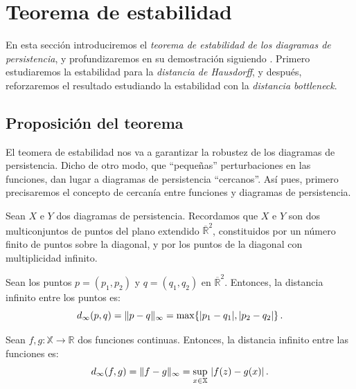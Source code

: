 
\section{Teorema de estabilidad}
En esta sección introduciremos el \emph{teorema de estabilidad de los diagramas de persistencia}, y profundizaremos en su demostración siguiendo \cite{Cohen-Steiner2007}. Primero estudiaremos la estabilidad para la \emph{distancia de Hausdorff}, y después, reforzaremos el resultado estudiando la estabilidad con la \emph{distancia bottleneck}.
\subsection{Proposición del teorema}
El teomera de estabilidad nos va a garantizar la robustez de los diagramas de persistencia. Dicho de otro modo, que ``pequeñas'' perturbaciones en las funciones, dan lugar a diagramas de persistencia ``cercanos''. Así pues, primero precisaremos el concepto de cercanía entre funciones y diagramas de persistencia.

Sean $X$ e $Y$ dos diagramas de persistencia. Recordamos que $X$ e $Y$ son dos multiconjuntos de puntos del plano extendido $\overline{\mathbb{R}}^2$, constituidos por un número finito de puntos sobre la diagonal, y por los puntos de la diagonal con multiplicidad infinito. 

\begin{definition}
Sean los puntos $p=(p_1, p_2)$ y $q=(q_1,q_2)$ en $\overline{\mathbb{R}}^2$. Entonces, la distancia infinito entre los puntos es:
\[
d_\infty(p, q)=\lVert p-q\rVert_\infty= \max\{\lvert p_1 - q_1\rvert, \lvert p_2-q_2\rvert\}\,.
\]
\end{definition}

\begin{definition}
Sean $f,g: \mathbb{X} \to \mathbb{R}$ dos funciones continuas. Entonces, la distancia infinito entre las funciones es:
\[
d_\infty(f, g)=\lVert f-g\rVert_\infty= \sup_{x\in \mathbb{X}}\ \lvert f(z) - g(x)\rvert\,.
\]
\end{definition}

